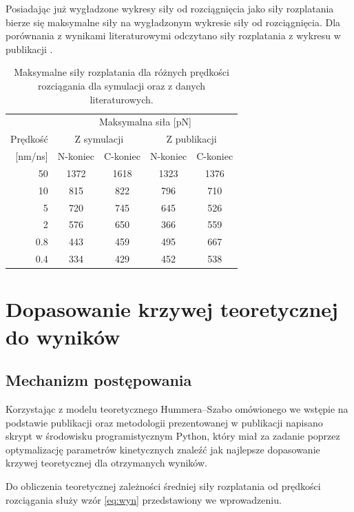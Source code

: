 Posiadając już wygładzone wykresy siły od rozciągnięcia jako siły rozplatania bierze się maksymalne siły na wygładzonym wykresie siły od rozciągnięcia. Dla porównania z wynikami literaturowymi odczytano siły rozplatania z wykresu w publikacji \cite{1tki}.

\begin{center}
\begin{table}[h]
\centering
  \begin{tabular}{| r | c | c | c | c |}
  \hline
      & \multicolumn{4}{|c|}{Maksymalna siła [pN]} \\
\cline{2-5}
	Prędkość & \multicolumn{2}{|c|}{Z symulacji} & \multicolumn{2}{|c|}{Z publikacji} \\
\cline{2-5}
[nm/ns] &  N-koniec  & C-koniec &  N-koniec  & C-koniec \\
  \hline
  50 & 1372 & 1618  & 1323 & 1376\\
  10 & 815 & 822 & 796 & 710 \\
  5 &  720 & 745 & 645 & 526 \\
  2 & 576 & 650 &  366 & 559\\
  0.8 & 443 & 459 &  495 & 667\\
  0.4 & 334 & 429 & 452 & 538\\
  \hline
  \end{tabular}
  \caption{Maksymalne siły rozplatania dla różnych prędkości rozciągania dla symulacji oraz z danych literaturowych.}
\end{table}
\end{center}

\section{Dopasowanie krzywej teoretycznej do wyników}

\subsection{Mechanizm postępowania}

Korzystając z modelu teoretycznego Hummera--Szabo omówionego we wstępie na podstawie publikacji \cite{Hummer_Szabo_2003} oraz metodologii prezentowanej w publikacji \cite{szul} napisano skrypt w środowisku programistycznym Python, który miał za zadanie poprzez optymalizację parametrów kinetycznych znaleźć jak najlepsze dopasowanie krzywej teoretycznej dla otrzymanych wyników.

Do obliczenia teoretycznej zależności średniej siły rozplatania od prędkości rozciągania służy wzór \ref{eq:wyn} przedstawiony we wprowadzeniu.

